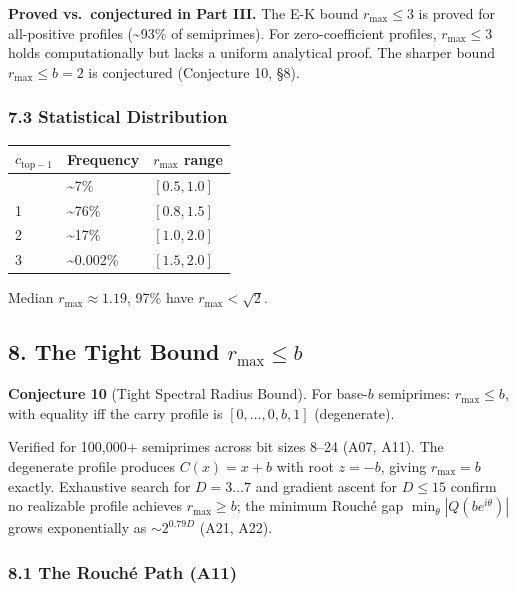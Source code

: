\documentclass[
  11pt,
]{article}
\begin{document}
\textbf{Proved vs.~conjectured in Part III.} The E-K bound \(r_{\max} \leq 3\)
is proved for all-positive profiles (\textasciitilde93\% of semiprimes). For
zero-coefficient profiles, \(r_{\max} \leq 3\) holds computationally but lacks a
uniform analytical proof. The sharper bound \(r_{\max} \leq b = 2\) is
conjectured (Conjecture 10, §8).

\subsubsection{7.3 Statistical Distribution}\label{statistical-distribution}

\begin{longtable}[]{@{}lll@{}}
\toprule\noalign{}
\(c_{\text{top}-1}\) & Frequency & \(r_{\max}\) range \\
\midrule\noalign{}
\endhead
\bottomrule\noalign{}
\endlastfoot
0 & \textasciitilde7\% & \([0.5, 1.0]\) \\
1 & \textasciitilde76\% & \([0.8, 1.5]\) \\
2 & \textasciitilde17\% & \([1.0, 2.0]\) \\
3 & \textasciitilde0.002\% & \([1.5, 2.0]\) \\
\end{longtable}

Median \(r_{\max} \approx 1.19\), 97\% have \(r_{\max} < \sqrt{2}\).

\newpage

\subsection{\texorpdfstring{8. The Tight Bound
\(r_{\max} \leq b\)}{8. The Tight Bound r\_\{\textbackslash max\} \textbackslash leq b}}\label{the-tight-bound-r_max-leq-b}

\textbf{Conjecture 10} (Tight Spectral Radius Bound). For base-\(b\) semiprimes:
\(r_{\max} \leq b\), with equality iff the carry profile is
\([0, \ldots, 0, b, 1]\) (degenerate).

Verified for 100,000+ semiprimes across bit sizes 8--24 (A07, A11). The
degenerate profile produces \(C(x) = x + b\) with root \(z = -b\), giving
\(r_{\max} = b\) exactly. Exhaustive search for \(D = 3 \ldots 7\) and gradient
ascent for \(D \leq 15\) confirm no realizable profile achieves
\(r_{\max} \geq b\); the minimum Rouché gap \(\min_\theta |Q(be^{i\theta})|\)
grows exponentially as \(\sim 2^{0.79D}\) (A21, A22).

\subsubsection{8.1 The Rouché Path (A11)}\label{the-rouchuxe9-path-a11}
\end{document}
